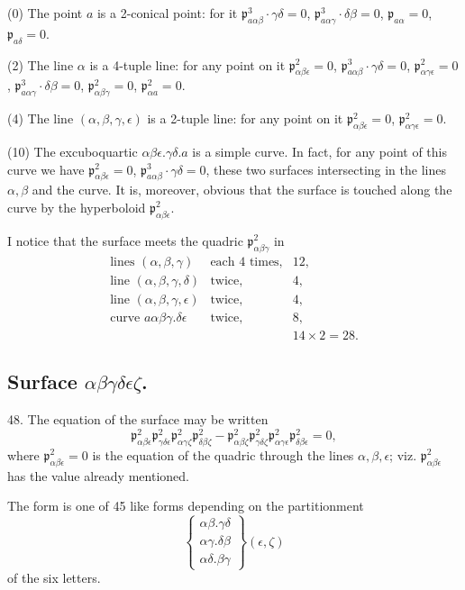 \documentclass[11pt,a4paper]{article}
\newcommand{\p}{\mathfrak p}
\newcommand{\surf}[1]{\par\smallskip\noindent{\itshape \{Surface $#1$.\}}\par\smallskip}
\begin{document}
(0) The point $a$ is a 2-conical point: for it
$\p^3_{a\alpha\beta}\cdot\gamma\delta=0$,
$\p^3_{a\alpha\gamma}\cdot\delta\beta=0$, $\p_{a\alpha}=0$,
$\p_{a\delta}=0$.

(2) The line $\alpha$ is a 4-tuple line: for any point on it
$\p^2_{\alpha\beta\epsilon}=0$, $\p^3_{a\alpha\beta}\cdot\gamma\delta=0$,
$\p^2_{\alpha\gamma\epsilon}=0$, $\p^3_{a\alpha\gamma}\cdot\delta\beta=0$,
$\p^2_{\alpha\beta\gamma}=0$, $\p^2_{\alpha a}=0$.

(4) The line $(\alpha,\beta,\gamma,\epsilon)$ is a 2-tuple line: for any point on it
$\p^2_{\alpha\beta\epsilon}=0$, $\p^2_{\alpha\gamma\epsilon}=0$.

(10) The excuboquartic $\alpha\beta\epsilon.\gamma\delta.a$ is a simple curve.
In fact, for any point of this curve we have
$\p^2_{\alpha\beta\epsilon}=0$, $\p^3_{a\alpha\beta}\cdot\gamma\delta=0$, these
two surfaces intersecting in the lines $\alpha,\beta$ and the curve. It is, moreover,
obvious that the surface is touched along the curve by the hyperboloid
$\p^2_{\alpha\beta\epsilon}$.

I notice that the surface meets the quadric $\p^2_{\alpha\beta\gamma}$ in
\[
\begin{array}{rcl}
\text{lines }(\alpha,\beta,\gamma)&\text{each 4 times,}&12,\\
\text{line }(\alpha,\beta,\gamma,\delta)&\text{twice,}&4,\\
\text{line }(\alpha,\beta,\gamma,\epsilon)&\text{twice,}&4,\\
\text{curve }a\alpha\beta\gamma.\delta\epsilon&\text{twice,}&8,\\
&&14\times2=28.
\end{array}
\]

\subsection*{Surface \(\alpha\beta\gamma\delta\epsilon\zeta\).}

48. The equation of the surface may be written
\[
\p^2_{\alpha\beta\epsilon}\p^2_{\gamma\delta\epsilon}
\p^2_{\alpha\gamma\zeta}\p^2_{\delta\beta\zeta}
-\p^2_{\alpha\beta\zeta}\p^2_{\gamma\delta\zeta}
\p^2_{\alpha\gamma\epsilon}\p^2_{\delta\beta\epsilon}=0,
\]
where $\p^2_{\alpha\beta\epsilon}=0$ is the equation of the quadric through the lines
$\alpha,\beta,\epsilon$; viz. $\p^2_{\alpha\beta\epsilon}$ has the value already
mentioned.

The form is one of 45 like forms depending on the partitionment
\[
\left\{\begin{array}{c}
\alpha\beta.\gamma\delta\\
\alpha\gamma.\delta\beta\\
\alpha\delta.\beta\gamma
\end{array}\right\}(\epsilon,\zeta)
\]
of the six letters.
\surf{\alpha\beta\gamma\delta\epsilon\zeta}
\end{document}
